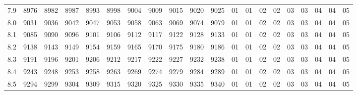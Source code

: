 \documentclass[12pt,UTF8,fontset=none]{ctexbook}
\begin{document}
\begin{appendix}
\begin{longtable}{|c| c c c c c | c c c c c| c c c c c c c c c|}
\scriptsize 7.9 & \scriptsize 8976 & \scriptsize 8982 & \scriptsize 8987 & \scriptsize 8993 & \scriptsize 8998 & \scriptsize 9004 & \scriptsize 9009 & \scriptsize 9015 & \scriptsize 9020 & \scriptsize 9025 & \scriptsize 01 & \scriptsize 01 & \scriptsize 02 & \scriptsize 02 & \scriptsize 03 & \scriptsize 03 & \scriptsize 04 & \scriptsize 04 & \scriptsize 05 \\
\scriptsize 8.0 & \scriptsize 9031 & \scriptsize 9036 & \scriptsize 9042 & \scriptsize 9047 & \scriptsize 9053 & \scriptsize 9058 & \scriptsize 9063 & \scriptsize 9069 & \scriptsize 9074 & \scriptsize 9079 & \scriptsize 01 & \scriptsize 01 & \scriptsize 02 & \scriptsize 02 & \scriptsize 03 & \scriptsize 03 & \scriptsize 04 & \scriptsize 04 & \scriptsize 05 \\
\scriptsize 8.1 & \scriptsize 9085 & \scriptsize 9090 & \scriptsize 9096 & \scriptsize 9101 & \scriptsize 9106 & \scriptsize 9112 & \scriptsize 9117 & \scriptsize 9122 & \scriptsize 9128 & \scriptsize 9133 & \scriptsize 01 & \scriptsize 01 & \scriptsize 02 & \scriptsize 02 & \scriptsize 03 & \scriptsize 03 & \scriptsize 04 & \scriptsize 04 & \scriptsize 05 \\
\scriptsize 8.2 & \scriptsize 9138 & \scriptsize 9143 & \scriptsize 9149 & \scriptsize 9154 & \scriptsize 9159 & \scriptsize 9165 & \scriptsize 9170 & \scriptsize 9175 & \scriptsize 9180 & \scriptsize 9186 & \scriptsize 01 & \scriptsize 01 & \scriptsize 02 & \scriptsize 02 & \scriptsize 03 & \scriptsize 03 & \scriptsize 04 & \scriptsize 04 & \scriptsize 05 \\
\scriptsize 8.3 & \scriptsize 9191 & \scriptsize 9196 & \scriptsize 9201 & \scriptsize 9206 & \scriptsize 9212 & \scriptsize 9217 & \scriptsize 9222 & \scriptsize 9227 & \scriptsize 9232 & \scriptsize 9238 & \scriptsize 01 & \scriptsize 01 & \scriptsize 02 & \scriptsize 02 & \scriptsize 03 & \scriptsize 03 & \scriptsize 04 & \scriptsize 04 & \scriptsize 05 \\
\scriptsize 8.4 & \scriptsize 9243 & \scriptsize 9248 & \scriptsize 9253 & \scriptsize 9258 & \scriptsize 9263 & \scriptsize 9269 & \scriptsize 9274 & \scriptsize 9279 & \scriptsize 9284 & \scriptsize 9289 & \scriptsize 01 & \scriptsize 01 & \scriptsize 02 & \scriptsize 02 & \scriptsize 03 & \scriptsize 03 & \scriptsize 04 & \scriptsize 04 & \scriptsize 05 \\
\scriptsize 8.5 & \scriptsize 9294 & \scriptsize 9299 & \scriptsize 9304 & \scriptsize 9309 & \scriptsize 9315 & \scriptsize 9320 & \scriptsize 9325 & \scriptsize 9330 & \scriptsize 9335 & \scriptsize 9340 & \scriptsize 01 & \scriptsize 01 & \scriptsize 02 & \scriptsize 02 & \scriptsize 03 & \scriptsize 03 & \scriptsize 04 & \scriptsize 04 & \scriptsize 05 \\

\end{longtable}
\end{appendix}
\end{document}
